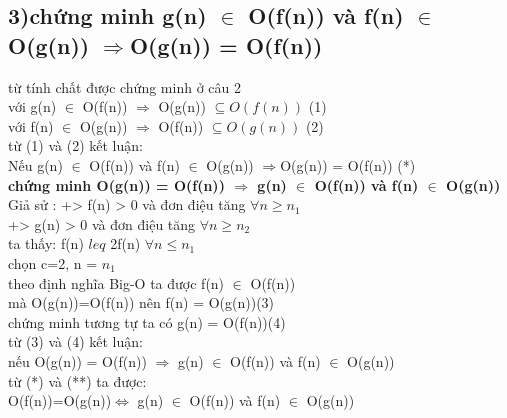 \documentclass[10pt,a4paper]{article}
\begin{document}
\subsection*{3)chứng minh g(n) $\in$ O(f(n)) và f(n) $\in$ O(g(n)) $\Rightarrow $O(g(n)) = O(f(n))}
từ tính chất được chứng minh ở câu 2\\
với g(n) $\in$ O(f(n)) $\Rightarrow$ O(g(n)) $\subseteq O(f(n))$ (1)\\
với f(n) $\in$ O(g(n)) $\Rightarrow$ O(f(n)) $\subseteq O(g(n))$ (2)\\
từ (1) và (2) kết luận:\\
Nếu g(n) $\in$ O(f(n)) và f(n) $\in$ O(g(n)) $\Rightarrow $O(g(n)) = O(f(n)) (*)\\
\textbf{chứng minh O(g(n)) = O(f(n)) $\Rightarrow$ g(n) $\in$ O(f(n)) và f(n) $\in$ O(g(n))}\\
Giả sử : 
+> f(n) > 0 và đơn điệu tăng $\forall n \geq n_1$\\
+> g(n) > 0 và đơn điệu tăng $\forall n \geq n_2$\\
ta thấy: f(n) $leq$ 2f(n) $\forall n \leq n_1$\\
chọn c=2, n = $n_1$\\
theo định nghĩa Big-O ta được f(n) $\in$ O(f(n))\\
mà O(g(n))=O(f(n)) nên f(n) = O(g(n))(3)\\
chứng minh tương tự ta có g(n) = O(f(n))(4)\\
từ (3) và (4) kết luận:\\
nếu O(g(n)) = O(f(n)) $\Rightarrow$ g(n) $\in$ O(f(n)) và f(n) $\in$ O(g(n))\\
từ (*) và (**) ta được:\\
O(f(n))=O(g(n))$\Leftrightarrow$ g(n) $\in$ O(f(n)) và f(n) $\in$ O(g(n))\\
\end{document}
